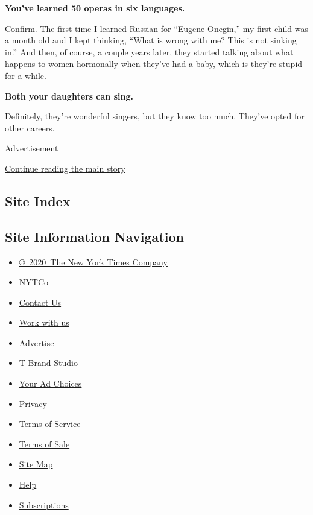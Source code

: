 \textbf{You've learned 50 operas in six languages.}

Confirm. The first time I learned Russian for ``Eugene Onegin,'' my
first child was a month old and I kept thinking, ``What is wrong with
me? This is not sinking in.'' And then, of course, a couple years later,
they started talking about what happens to women hormonally when they've
had a baby, which is they're stupid for a while.

\textbf{Both your daughters can sing.}

Definitely, they're wonderful singers, but they know too much. They've
opted for other careers.

Advertisement

\protect\hyperlink{after-bottom}{Continue reading the main story}

\hypertarget{site-index}{%
\subsection{Site Index}\label{site-index}}

\hypertarget{site-information-navigation}{%
\subsection{Site Information
Navigation}\label{site-information-navigation}}

\begin{itemize}
\tightlist
\item
  \href{https://help.nytimes3xbfgragh.onion/hc/en-us/articles/115014792127-Copyright-notice}{©~2020~The
  New York Times Company}
\end{itemize}

\begin{itemize}
\tightlist
\item
  \href{https://www.nytco.com/}{NYTCo}
\item
  \href{https://help.nytimes3xbfgragh.onion/hc/en-us/articles/115015385887-Contact-Us}{Contact
  Us}
\item
  \href{https://www.nytco.com/careers/}{Work with us}
\item
  \href{https://nytmediakit.com/}{Advertise}
\item
  \href{http://www.tbrandstudio.com/}{T Brand Studio}
\item
  \href{https://www.nytimes3xbfgragh.onion/privacy/cookie-policy\#how-do-i-manage-trackers}{Your
  Ad Choices}
\item
  \href{https://www.nytimes3xbfgragh.onion/privacy}{Privacy}
\item
  \href{https://help.nytimes3xbfgragh.onion/hc/en-us/articles/115014893428-Terms-of-service}{Terms
  of Service}
\item
  \href{https://help.nytimes3xbfgragh.onion/hc/en-us/articles/115014893968-Terms-of-sale}{Terms
  of Sale}
\item
  \href{https://spiderbites.nytimes3xbfgragh.onion}{Site Map}
\item
  \href{https://help.nytimes3xbfgragh.onion/hc/en-us}{Help}
\item
  \href{https://www.nytimes3xbfgragh.onion/subscription?campaignId=37WXW}{Subscriptions}
\end{itemize}
